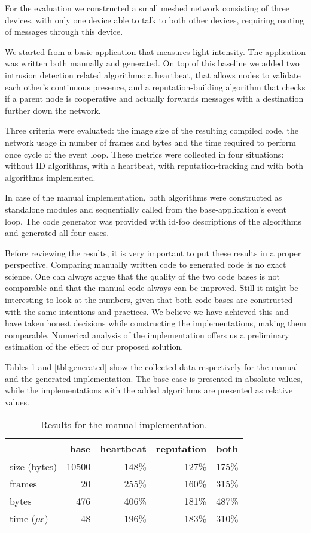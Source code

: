 \documentclass[conference]{IEEEtran}
\newcommand{\NAME}{id-foo\xspace}
\begin{document}
For the evaluation we constructed a small meshed network consisting of three
devices, with only one device able to talk to both other devices, requiring
routing of messages through this device.

We started from a basic application that measures light intensity. The
application was written both manually and generated. On top of this baseline we
added two intrusion detection related algorithms: a heartbeat, that allows
nodes to validate each other's continuous presence, and a reputation-building
algorithm that checks if a parent node is cooperative and actually forwards
messages with a destination further down the
network\cite{ganeriwal2008reputation}.

Three criteria were evaluated: the image size of the resulting compiled code,
the network usage in number of frames and bytes and the time required to
perform once cycle of the event loop. These metrics were collected in four
situations: without ID algorithms, with a heartbeat, with reputation-tracking
and with both algorithms implemented.

In case of the manual implementation, both algorithms were constructed as
standalone modules and sequentially called from the base-application's event
loop. The code generator was provided with \NAME descriptions of the algorithms
and generated all four cases.

Before reviewing the results, it is very important to put these results in a
proper perspective. Comparing manually written code to generated code is no
exact science. One can always argue that the quality of the two code bases is
not comparable and that the manual code always can be improved. Still it might
be interesting to look at the numbers, given that both code bases are
constructed with the same intentions and practices. We believe we have achieved
this and have taken honest decisions while constructing the implementations,
making them comparable. Numerical analysis of the implementation offers us a
preliminary estimation of the effect of our proposed solution.

Tables \ref{tbl:manual} and \ref{tbl:generated} show the collected data
respectively for the manual and the generated implementation. The base case is
presented in absolute values, while the implementations with the added
algorithms are presented as relative values.

\begin{table}[H]
  \centering
  \begin{tabular}{lrrrr}
  \hline
      & base & heartbeat & reputation & both\\
  \hline
  size (bytes) & 10500 & 148\% & 127\% & 175\%\\
  frames & 20 & 255\% & 160\% & 315\%\\
  bytes & 476 & 406\% & 181\% & 487\%\\
  time ($\mu$s) & 48 & 196\% & 183\% & 310\%\\
  \hline
  \end{tabular}
  \caption{Results for the manual implementation.}
  \label{tbl:manual}
\end{table}
\end{document}
